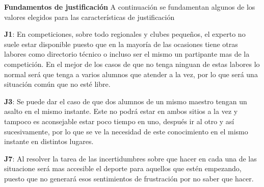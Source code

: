 \textbf{Fundamentos de justificación}
A continuación se fundamentan algunos de los valores elegidos para las características de justificación

\begin{compactitem}
  \item[\textbf{J1}:] En competiciones, sobre todo regionales y clubes pequeños, el experto
     no suele estar disponible puesto que en la mayoría de las ocasiones tiene otras labores
     como directorio técnico o incluso ser el mismo un partipante mas de la competición.
     En el mejor de los casos de que no tenga ninguan de estas labores lo normal será que
     tenga a varios alumnos que atender a la vez, por lo que será una situación común que no esté libre.
  \item[\textbf{J3}:] Se puede dar el caso de que dos alumnos de un mismo maestro tengan un
     asalto en el mismo instante. Este no podrá estar en ambos sitios a la vez y tampoco es
     aconsejable estar poco tiempo en uno, después ir al otro y así sucesivamente, por lo que
     se ve la necesidad de este conocimiento en el mismo instante en distintos lugares.
  \item[\textbf{J7}:] Al resolver la tarea de las incertidumbres sobre que hacer
     en cada una de las situacione será mas accesible el deporte para aquellos que estén
     empezando, puesto que no generará esos sentimientos de frustración por no saber que hacer.
\end{compactitem}
\newpage

